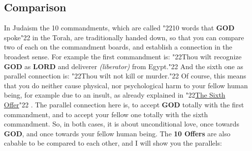 \documentclass[12pt,a4paper]{article}
\newcommand{\God}[0]{\textbf{GOD}}
\newcommand{\Lord}[0]{\textbf{LORD}}
\newcommand{\q}[1]{\char"22{#1}\char"22 }
\begin{document}
	\subsection{Comparison}
		In Judaism the 10 commandments,
		which are called \q{10 words that {\God} spoke} in the Torah,
		are traditionally handed down,
		so that you can compare two of each on the commandment boards,
		and establish a connection in the broadest sense.
		For example the first commandment is:
		\q{Thou wilt recognize {\God} as {\Lord} and deliverer \textit{(liberator)} from Egypt.}
		And the sixth one as parallel connection is:
		\q{Thou wilt not kill or murder.}
		Of course,
		this means that you do neither cause physical,
		nor psychological harm to your fellow human being,
		for example due to an insult,
		as already explained in \q{\hyperref[TheSixthOffer]{The Sixth Offer}}.
		The parallel connection here is,
		to accept {\God} totally with the first commandment,
		and to accept your fellow one totally with the sixth commandment.
		So,
		in both cases,
		it is about unconditional love,
		once towards {\God},
		and once towards your fellow human being.
		The \textbf{10 Offers} are also cabable to be compared to each other,
		and I will show you the parallels:
		\\
\end{document}
